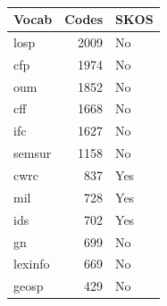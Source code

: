\begin{table}[h]
\begin{tabular}{|l|r|l|}
\end{tabular}
\,
\begin{tabular}{|l|r|l|}
\hline
\textbf{Vocab} & \textbf{Codes} & \textbf{SKOS} \\ \hline
losp           & 2009 & No  \\ \hline
cfp            & 1974 & No  \\ \hline
oum            & 1852 & No  \\ \hline
cff            & 1668 & No  \\ \hline
ifc            & 1627 & No  \\ \hline
semsur         & 1158 & No  \\ \hline
cwrc           & 837  & Yes \\ \hline
mil            & 728  & Yes \\ \hline
ids            & 702  & Yes \\ \hline
gn             & 699  & No  \\ \hline
lexinfo        & 669  & No  \\ \hline
geosp          & 429  & No  \\ \hline

\end{tabular}
\end{table}
